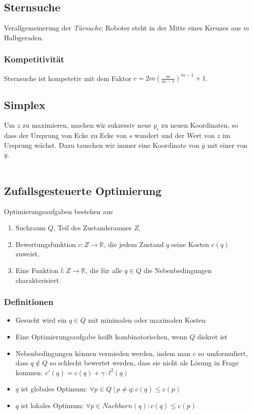 \subsection{Sternsuche}
Verallgemeinerung der \textit{Türsuche}: Roboter steht in der Mitte eines Kreuzes aus \(m\) Halbgeraden.
\text{}\\


\subsubsection{Kompetitivität}
Sternsuche ist kompetetiv mit dem Faktor \(c = 2m \left(\frac{m}{m-1}\right)^{m-1}+1\).


\subsection{Simplex}
Um \(z\) zu maximieren, machen wir sukzessiv neue \(y_i\) zu neuen Koordinaten, so dass der Ursprung von Ecke zu Ecke von \(s\) wandert und der Wert von \(z\) im Ursprung wächst. Dazu tauschen wir immer eine Koordinate von \(\overline{y}\) mit einer von \(\overline{\overline{y}}\).
\text{}\\

\text{}\\



\subsection{Zufallsgesteuerte Optimierung}
Optimierungsaufgaben bestehen aus 
\begin{enumerate}
	\item Suchraum $Q$, Teil des Zustandsraumes $Z$,
	\item Bewertungsfunktion $c: Z \rightarrow \mathbb{R}$, die jedem Zustand $q$ seine Kosten $c(q)$ zuweist,
	\item Eine Funktion $l: Z \rightarrow \mathbb{R}$, die für alle $q \in Q$ die Nebenbedingungen charakterisiert.
\end{enumerate}

\subsubsection{Definitionen}
\begin{itemize}
	\item Gesucht wird ein \(q \in Q\) mit minimalen oder maximalen Kosten
	\item Eine Optimierungsaufgabe heißt kombinatorischen, wenn \(Q\) diskret ist
	\item Nebenbedingungen können vermieden werden, indem man \(c\) so umformuliert, dass \(q \not\in Q\) so schlecht bewertet werden, dass sie nicht als Lösung in Frage kommen: \(c'(q) = c(q) + \gamma \cdot l^2(q)\)
	\item \(q\) ist globales Optimum: \(\forall p \in Q~|~p \ne q: c(q) \le c(p)\)
	\item \(q\) ist lokales Optimum: \(\forall p \in Nachbarn(q): c(q) \le c(p)\)
\end{itemize}

